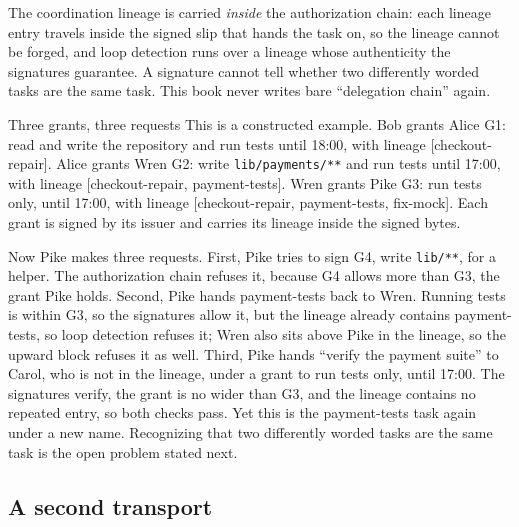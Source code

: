 \documentclass[11pt,a4paper]{article}
\theoremstyle{definition}
\theoremstyle{remark}
\begin{document}
The coordination lineage is carried \emph{inside} the authorization chain:
each lineage entry travels inside the signed slip that hands the task on, so
the lineage cannot be forged, and loop detection runs over a lineage whose
authenticity the signatures guarantee. A signature cannot tell whether two
differently worded tasks are the same task. This book never writes bare
``delegation chain'' again.

\begin{pdexample}{Three grants, three requests}
This is a constructed example. Bob grants Alice G1: read and write the
repository and run tests until 18:00, with lineage [checkout-repair]. Alice
grants Wren G2: write \texttt{lib/payments/**} and run tests until 17:00, with
lineage [checkout-repair, payment-tests]. Wren grants Pike G3: run tests only,
until 17:00, with lineage [checkout-repair, payment-tests, fix-mock]. Each
grant is signed by its issuer and carries its lineage inside the signed bytes.

Now Pike makes three requests. First, Pike tries to sign G4, write
\texttt{lib/**}, for a helper. The authorization chain refuses it, because G4
allows more than G3, the grant Pike holds. Second, Pike hands payment-tests back to Wren. Running tests is within
G3, so the signatures allow it, but the lineage already contains
payment-tests, so loop detection refuses it; Wren also sits above Pike in the
lineage, so the upward block refuses it as well. Third, Pike hands ``verify
the payment suite'' to Carol, who is not in the lineage, under a grant to run
tests only, until 17:00. The signatures verify, the grant is no wider than G3, and the
lineage contains no repeated entry, so both checks pass. Yet this is the
payment-tests task again under a new name. Recognizing that two differently
worded tasks are the same task is the open problem stated next.
\end{pdexample}



\FloatBarrier

\subsection{A second transport}
\end{document}
